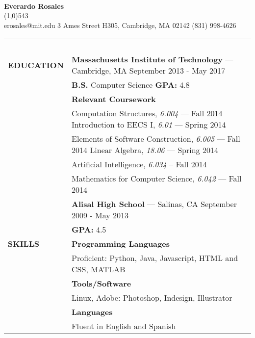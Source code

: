 \documentclass[11pt,letterpaper]{article}
\begin{document}
\raggedright
\ \\

\textbf{\huge{Everardo Rosales}}\hfill 
{}\    
\\
\vspace{-8pt}
\line(1,0){543}\\
erosales@mit.edu \hfill 3 Ames Street H305, Cambridge, MA 02142 \hfill (831)
998-4626\\
\vspace{5pt}

\begin{tabular}{@{}lp{6.6in}}
\ \\
\textbf{EDUCATION}
&\textbf{Massachusetts Institute of Technology} --- Cambridge, MA \hfill September 2013 - May 2017\\
&\textbf{B.S.} Computer Science \qquad \textbf{GPA:} 4.8\\
&\textbf{Relevant Coursework}\\
&\hspace{10pt} Computation Structures, \emph{6.004} --- Fall 2014 \hspace{57pt} Introduction to EECS I, \emph{6.01} --- Spring 2014\\
&\hspace{10pt} Elements of Software Construction, \emph{6.005} --- Fall 2014 \hspace{10pt} Linear Algebra, \emph{18.06} --- Spring 2014\\
&\hspace{10pt} Artificial Intelligence, \emph{6.034} -- Fall 2014 \\
&\hspace{10pt} Mathematics for Computer Science, \emph{6.042} --- Fall 2014\\
&\textbf{Alisal High School} --- Salinas, CA \hfill September 2009 - May 2013\\
&\textbf{GPA:} 4.5\\

\textbf{SKILLS}
&\textbf{Programming Languages}\\
&\hspace{10pt}Proficient: Python, Java, Javascript, HTML and CSS, MATLAB\\
&\textbf{Tools/Software}\\
&\hspace{10pt}Linux, Adobe: Photoshop, Indesign, Illustrator\\
&\textbf{Languages}\\
&\hspace{10pt}Fluent in English and Spanish\\


\end{tabular}
\end{document}

